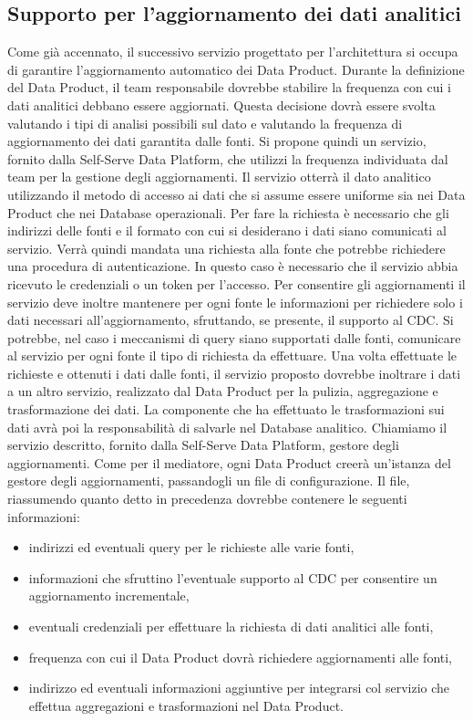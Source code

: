\documentclass[a4paper,12pt]{report}
\begin{document}
\subsection{Supporto per l'aggiornamento dei dati analitici}
Come già accennato, il successivo servizio progettato per l'architettura si occupa di garantire l'aggiornamento automatico dei Data Product.
Durante la definizione del Data Product, il team responsabile dovrebbe stabilire la frequenza con cui i dati analitici debbano essere aggiornati.
Questa decisione dovrà essere svolta valutando i tipi di analisi possibili sul dato e valutando la frequenza di aggiornamento dei dati garantita dalle fonti. 
Si propone quindi un servizio, fornito dalla Self-Serve Data Platform, che utilizzi la frequenza individuata dal team per la gestione degli aggiornamenti.
Il servizio otterrà il dato analitico utilizzando il metodo di accesso ai dati che si assume essere uniforme sia nei Data Product che nei Database operazionali.
Per fare la richiesta è necessario che gli indirizzi delle fonti e il formato con cui si desiderano i dati siano comunicati al servizio.
Verrà quindi mandata una richiesta alla fonte che potrebbe richiedere una procedura di autenticazione. 
In questo caso è necessario che il servizio abbia ricevuto le credenziali o un token per l'accesso.
Per consentire gli aggiornamenti il servizio deve inoltre mantenere per ogni fonte le informazioni per richiedere solo i dati necessari all'aggiornamento, sfruttando, se presente, il supporto al CDC.
Si potrebbe, nel caso i meccanismi di query siano supportati dalle fonti, comunicare al servizio per ogni fonte il tipo di richiesta da effettuare. 
Una volta effettuate le richieste e ottenuti i dati dalle fonti, il servizio proposto dovrebbe inoltrare i dati a un altro servizio, realizzato dal Data Product per la pulizia, aggregazione e trasformazione dei dati. 
La componente che ha effettuato le trasformazioni sui dati avrà poi la responsabilità di salvarle nel Database analitico.
Chiamiamo il servizio descritto, fornito dalla Self-Serve Data Platform, gestore degli aggiornamenti.
Come per il mediatore, ogni Data Product creerà un'istanza del gestore degli aggiornamenti, passandogli un file di configurazione.
Il file, riassumendo quanto detto in precedenza dovrebbe contenere le seguenti informazioni: 
\begin{itemize}
    \item indirizzi ed eventuali query per le richieste alle varie fonti,
    \item informazioni che sfruttino l'eventuale supporto al CDC per consentire un aggiornamento incrementale,
    \item eventuali credenziali per effettuare la richiesta di dati analitici alle fonti,
    \item frequenza con cui il Data Product dovrà richiedere aggiornamenti alle fonti, 
    \item indirizzo ed eventuali informazioni aggiuntive per integrarsi col servizio che effettua aggregazioni e trasformazioni nel Data Product.
\end{itemize}
\end{document}
